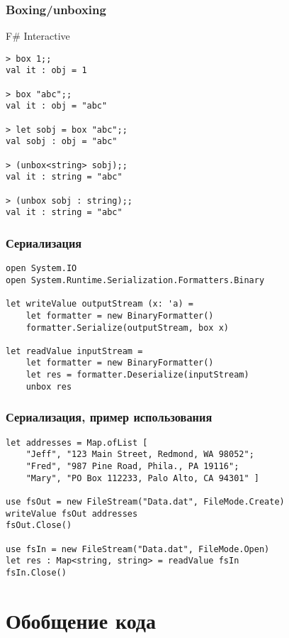 \documentclass{../../slides-style}
\begin{document}
    \begin{frame}[fragile]
        \frametitle{Boxing/unboxing}
        \begin{alertblock}{F\# Interactive}
            \begin{verbatim}
> box 1;;
val it : obj = 1

> box "abc";;
val it : obj = "abc"

> let sobj = box "abc";;
val sobj : obj = "abc"

> (unbox<string> sobj);;
val it : string = "abc"

> (unbox sobj : string);;
val it : string = "abc"
            \end{verbatim}
        \end{alertblock}
    \end{frame}

    \begin{frame}[fragile]
        \frametitle{Сериализация}
        \begin{verbatim}
open System.IO
open System.Runtime.Serialization.Formatters.Binary

let writeValue outputStream (x: 'a) =
    let formatter = new BinaryFormatter()
    formatter.Serialize(outputStream, box x)

let readValue inputStream =
    let formatter = new BinaryFormatter()
    let res = formatter.Deserialize(inputStream)
    unbox res
        \end{verbatim}
    \end{frame}

    \begin{frame}[fragile]
        \frametitle{Сериализация, пример использования}
        \begin{verbatim}
let addresses = Map.ofList [ 
    "Jeff", "123 Main Street, Redmond, WA 98052";
    "Fred", "987 Pine Road, Phila., PA 19116";
    "Mary", "PO Box 112233, Palo Alto, CA 94301" ]

use fsOut = new FileStream("Data.dat", FileMode.Create)
writeValue fsOut addresses
fsOut.Close()

use fsIn = new FileStream("Data.dat", FileMode.Open)
let res : Map<string, string> = readValue fsIn
fsIn.Close()
        \end{verbatim}
    \end{frame}

    \section{Обобщение кода}
\end{document}
